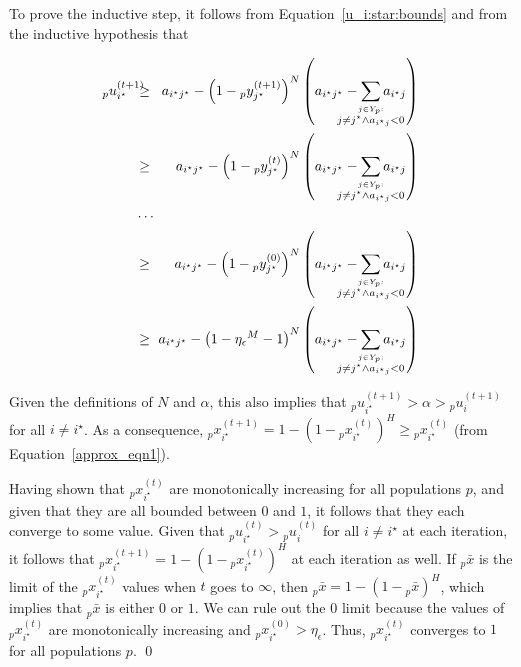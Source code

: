 \documentclass{sig-alt-full}
\def\clap#1{\hbox to 0pt{\hss#1\hss}}
\def\mathclap{\mathpalette\mathclapinternal}
\def\mathclapinternal#1#2{%
	\clap{$\mathsurround=0pt#1{#2}$}}
\newcommand\laxsumb[2]{\displaystyle\sum_{\mathclap{\stackrel{{#1} :}{#2}}}}
\begin{document}
\begin{multicols}{2}
To prove the inductive step, it follows from Equation~\ref{u_i:star:bounds} and from the inductive hypothesis that 

\noindent\begin{eqnarray*}
{_p}u^{(t+1)}_{i^\star} \!\!\!\!& \geq & \!\!\!\!a_{i^\star j^\star} - \left( 1 - {_p}y^{(t+1)}_{j^\star} \right) ^N \left( a_{i^\star j^\star}  - \laxsumb{j \in Y_{p}}{j \neq j^\star \wedge a_{i^\star j} < 0} { a_{i^\star j} } \right)\\
& \geq & \!\!\!\!a_{i^\star j^\star} - \left( 1 - {_p}y^{(t)}_{j^\star} \right) ^N \left( a_{i^\star j^\star}  - \laxsumb{j \in Y_{p}}{j \neq j^\star \wedge a_{i^\star j} < 0} { a_{i^\star j} } \right)\\
& \cdots &\\
& \geq & \!\!\!\!a_{i^\star j^\star} - \left( 1 - {_p}y^{(0)}_{j^\star} \right) ^N \left( a_{i^\star j^\star}  - \laxsumb{j \in Y_{p}}{j \neq j^\star \wedge a_{i^\star j} < 0} { a_{i^\star j} } \right)\\
& \geq & \!\!\!\!a_{i^\star j^\star} - \left( 1 - {\eta_\epsilon}^M-1 \right) ^N \left( a_{i^\star j^\star}  - \laxsumb{j \in Y_{p}}{j \neq j^\star \wedge a_{i^\star j} < 0} { a_{i^\star j} } \right)
\end{eqnarray*}

Given the definitions of $N$ and $\alpha$, this also implies that ${_p}u^{(t+1)}_{i^\star} > \alpha > {_p}u^{(t+1)}_{i}$ for all $i \neq i^\star$.  As a consequence, \mbox{${_p}x^{(t+1)}_{i^\star} = 1 - ( 1 - {_p}x^{(t)}_{i^\star})^H \geq {_p}x^{(t)}_{i^\star}$} (from Equation~\ref{approx_eqn1}).

Having shown that ${_p}x^{(t)}_{i^\star}$ are monotonically increasing for all populations $p$, and given that they are all bounded between $0$ and $1$, it follows that they each converge to some value.  Given that ${_p}u^{(t)}_{i^\star} > {_p}u^{(t)}_i$ for all $i \neq i^\star$ at each iteration, it follows that ${_p}x^{(t+1)}_{i^\star} = 1 - ( 1 - {_p}x^{(t)}_{i^\star} )^H$ at each iteration as well.  If ${_p}\bar{x}$ is the limit of the ${_p}x^{(t)}_{i^\star}$ values when $t$ goes to $\infty$, then ${_p}\bar{x} = 1 - \left( 1 - {_p}\bar{x} \right)^H$, which implies that ${_p}\bar{x}$ is either $0$ or $1$.  We can rule out the $0$ limit because the values of ${_p}x^{(t)}_{i^\star}$ are monotonically increasing and ${_p}x^{(0)}_{i^\star}>\eta_\epsilon$.  Thus, ${_p}x^{(t)}_{i^\star}$ converges to $1$ for all populations $p$. \qed


\vspace{1em}
\end{multicols}
\end{document}
